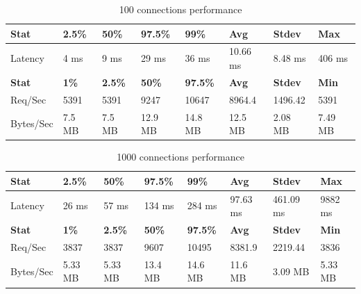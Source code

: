 \documentclass[../Main.tex]{subfiles}
\begin{document}
\begin{table}[H]
  \centering
\begin{tabular}{|l|l|l|l|l|l|l|l|}
\hline
\rowcolor[HTML]{f56b00}
\textbf{Stat} & \textbf{2.5\%} & \textbf{50\%} & \textbf{97.5\%} & \textbf{99\%} & \textbf{Avg} & \textbf{Stdev} & \textbf{Max} \\
\hline
Latency   & 4 ms  & 9 ms & 29 ms   & 36 ms & 10.66 ms & 8.48 ms & 406 ms \\
\hline
\rowcolor[HTML]{f56b00}
\textbf{Stat} & \textbf{1\%} & \textbf{2.5\%} & \textbf{50\%} & \textbf{97.5\%} & \textbf{Avg} & \textbf{Stdev} & \textbf{Min} \\
Req/Sec   & 5391   & 5391   & 9247    & 10647   & 8964.4  & 1496.42 & 5391    \\
\hline
Bytes/Sec & 7.5 MB & 7.5 MB & 12.9 MB & 14.8 MB & 12.5 MB & 2.08 MB & 7.49 MB \\
\hline
\end{tabular}
 \caption{100 connections performance}
 \label{100-connections-performance}
\end{table}

\begin{table}[H]
\centering
\begin{tabular}{|l|l|l|l|l|l|l|l|}
\hline
\rowcolor[HTML]{f56b00}
\textbf{Stat} & \textbf{2.5\%} & \textbf{50\%} & \textbf{97.5\%} & \textbf{99\%} & \textbf{Avg} & \textbf{Stdev} & \textbf{Max} \\
\hline
Latency & 26 ms & 57 ms & 134 ms & 284 ms & 97.63 ms & 461.09 ms & 9882 ms \\
\hline
\rowcolor[HTML]{f56b00}
\textbf{Stat} & \textbf{1\%} & \textbf{2.5\%} & \textbf{50\%} & \textbf{97.5\%} & \textbf{Avg} & \textbf{Stdev} & \textbf{Min} \\
Req/Sec & 3837 & 3837 & 9607 & 10495 & 8381.9 & 2219.44 & 3836 \\
\hline
Bytes/Sec & 5.33 MB & 5.33 MB & 13.4 MB & 14.6 MB & 11.6 MB & 3.09 MB & 5.33 MB \\
\hline
\end{tabular}
 \caption{1000 connections performance}
 \label{1000-connections-performance}
\end{table}
\end{document}
